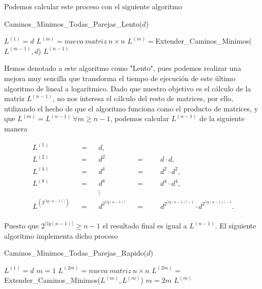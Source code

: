 Podemos calcular este proceso con el siguiente algoritmo

\begin{breakablealgorithm}
	\caption{Caminos\_Minimos\_Todas\_Parejas\_Lento($d$)}
	\begin{algorithmic}[1]
		\State $L^{(1)}=d$
			\State $L^{(m)}=nueva\ matriz\ n\times n$
			\State $L^{(m)}=$Extender\_Caminos\_Minimos($L^{(m-1)},d$)
		\EndFor
		\Return $L^{(n-1)}$
	\end{algorithmic}
\end{breakablealgorithm}

Hemos denotado a este algoritmo como "Lento", pues podemos realizar una mejora muy sencilla que transforma el tiempo de ejecución de este último algoritmo de lineal a logarítmico. Dado que nuestro objetivo es el cálculo de la matriz $L^{(n-1)}$, no nos interesa el cálculo del resto de matrices, por ello, utilizando el hecho de que el algoritmo funciona como el producto de matrices, y que $L^{(m)}=L^{(n-1)}\ \forall m\geq n-1$, podemos calcular $L^{(n-1)}$ de la siguiente manera

\begin{adjustwidth}{3.5cm}{10cm}
	\begin{align*}
		L^{(1)} &&=&&  d, \\
		L^{(2)} &&=&&   d^2 &&=&& & d\cdot d,\\
		L^{(4)} &&=&&   d^4 &&=&&  &d^2\cdot d^2,\\
		L^{(8)} &&=&&   d^8 &&=&&  &d^4\cdot d^4,\\
		&&&& \vdots \\
		L^{(2^{\lceil lg(n-1)\rceil })} &&=&& d^{2^{\lceil lg(n-1)\rceil }} &&=&&  &d^{2^{\lceil lg(n-1)\rceil -1}}\cdot d^{2^{\lceil lg(n-1)\rceil -1}}.\\
	\end{align*}
\end{adjustwidth}

Puesto que $2^{\lceil lg(n-1)\rceil}\geq n-1$ el resultado final es igual a $L^{(n-1)}$. El siguiente algoritmo implementa dicho proceso

\begin{breakablealgorithm}
	\caption{Caminos\_Minimos\_Todas\_Parejas\_Rapido($d$)}
	\begin{algorithmic}[1]
		\State $L^{(1)}=d$
		\State $m=1$
			\State $L^{(2m)}=nueva\ matriz\ n\times n$
			\State $L^{(2m)}=$Extender\_Caminos\_Minimos($L^{(m)},L^{(m)}$)
			\State $m=2m$
		\EndWhile
		\Return $L^{(m)}$
	\end{algorithmic}
\end{breakablealgorithm}

